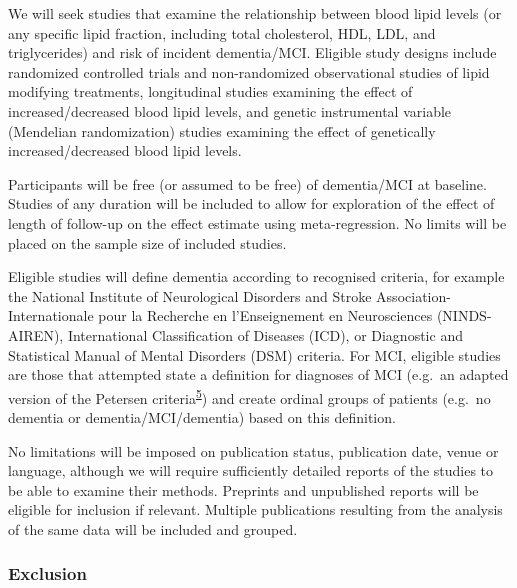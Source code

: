 \documentclass[a4paper, nobind]{templates/ociamthesis}
\begin{document}
We will seek studies that examine the relationship between blood lipid levels (or any specific lipid fraction, including total cholesterol, HDL, LDL, and triglycerides) and risk of incident dementia/MCI. Eligible study designs include randomized controlled trials and non-randomized observational studies of lipid modifying treatments, longitudinal studies examining the effect of increased/decreased blood lipid levels, and genetic instrumental variable (Mendelian randomization) studies examining the effect of genetically increased/decreased blood lipid levels.

Participants will be free (or assumed to be free) of dementia/MCI at baseline. Studies of any duration will be included to allow for exploration of the effect of length of follow-up on the effect estimate using meta-regression. No limits will be placed on the sample size of included studies.

Eligible studies will define dementia according to recognised criteria, for example the National Institute of Neurological Disorders and Stroke Association-Internationale pour la Recherche en l'Enseignement en Neurosciences (NINDS-AIREN), International Classification of Diseases (ICD), or Diagnostic and Statistical Manual of Mental Disorders (DSM) criteria. For MCI, eligible studies are those that attempted state a definition for diagnoses of MCI (e.g.~an adapted version of the Petersen criteria\textsuperscript{\protect\hyperlink{ref-petersen1999}{5}}) and create ordinal groups of patients (e.g.~no dementia or dementia/MCI/dementia) based on this definition.

No limitations will be imposed on publication status, publication date, venue or language, although we will require sufficiently detailed reports of the studies to be able to examine their methods. Preprints and unpublished reports will be eligible for inclusion if relevant. Multiple publications resulting from the analysis of the same data will be included and grouped.

\hypertarget{exclusion}{%
\subsubsection{Exclusion}\label{exclusion}}
\end{document}
